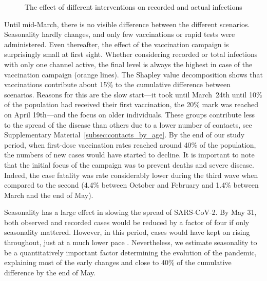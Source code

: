 \begin{figure}[!tp]
    \caption{The effect of different interventions on recorded and actual infections}
    \label{fig:2021_scenarios_broad}

\end{figure}

Until mid-March, there is no visible difference between the different scenarios.
Seasonality hardly changes, and only few vaccinations or rapid tests were administered.
Even thereafter, the effect of the vaccination campaign is surprisingly small at first
sight. Whether considering recorded or total infections with only one channel active,
the final level is always the highest in case of the vaccination campaign (orange
lines). The Shapley value decomposition shows that vaccinations contribute about 15\% to
the cumulative difference between scenarios. Reasons for this are the slow start---it
took until March~24th until 10\% of the population had received their first vaccination,
the 20\% mark was reached on April 19th---and the focus on older individuals. These
groups contribute less to the spread of the disease than others due to a lower number of
contacts, see Supplementary Material~\ref{subsec:contacts_by_age}. By the end of our
study period, when first-dose vaccination rates reached around 40\% of the population,
the numbers of new cases would have started to decline. It is important to note that the
initial focus of the campaign was to prevent deaths and severe disease. Indeed, the case
fatality was rate considerably lower during the third wave when compared to the second
(4.4\% between October and February and 1.4\% between March and the end of May).

Seasonality has a large effect in slowing the spread of SARS-CoV-2. By May 31, both
observed and recorded cases would be reduced by a factor of four if only seasonality
mattered. However, in this period, cases would have kept on rising throughout, just at a
much lower pace \citep[this is in line with results in][]{Gavenciak2021}. Nevertheless,
we estimate seasonality to be a quantitatively important factor determining the
evolution of the pandemic, explaining most of the early changes and close to 40\% of the
cumulative difference by the end of May.

